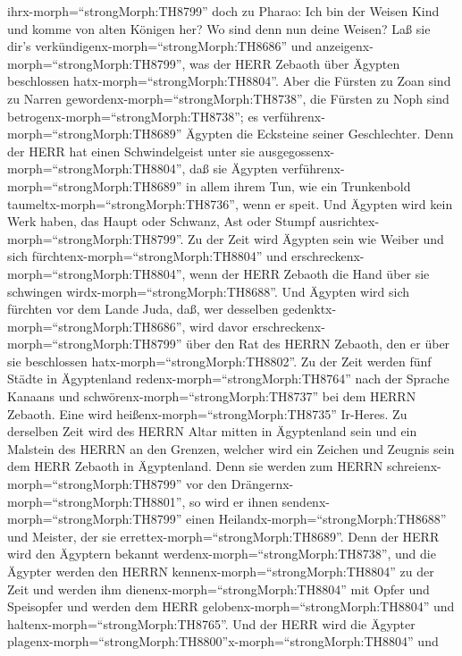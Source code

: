 ihrx-morph=``strongMorph:TH8799'' doch zu Pharao: Ich bin der Weisen
Kind und komme von alten Königen her?  Wo sind denn nun
deine Weisen? Laß sie dir's verkündigenx-morph=``strongMorph:TH8686''
und anzeigenx-morph=``strongMorph:TH8799'', was der HERR Zebaoth über
Ägypten beschlossen hatx-morph=``strongMorph:TH8804''. 
Aber die Fürsten zu Zoan sind zu Narren
gewordenx-morph=``strongMorph:TH8738'', die Fürsten zu Noph sind
betrogenx-morph=``strongMorph:TH8738''; es
verführenx-morph=``strongMorph:TH8689'' Ägypten die Ecksteine seiner
Geschlechter.  Denn der HERR hat einen Schwindelgeist unter
sie ausgegossenx-morph=``strongMorph:TH8804'', daß sie Ägypten
verführenx-morph=``strongMorph:TH8689'' in allem ihrem Tun, wie ein
Trunkenbold taumeltx-morph=``strongMorph:TH8736'', wenn er speit.
 Und Ägypten wird kein Werk haben, das Haupt oder Schwanz,
Ast oder Stumpf ausrichtex-morph=``strongMorph:TH8799''. 
Zu der Zeit wird Ägypten sein wie Weiber und sich
fürchtenx-morph=``strongMorph:TH8804'' und
erschreckenx-morph=``strongMorph:TH8804'', wenn der HERR Zebaoth die
Hand über sie schwingen wirdx-morph=``strongMorph:TH8688''.
 Und Ägypten wird sich fürchten vor dem Lande Juda, daß,
wer desselben gedenktx-morph=``strongMorph:TH8686'', wird davor
erschreckenx-morph=``strongMorph:TH8799'' über den Rat des HERRN
Zebaoth, den er über sie beschlossen hatx-morph=``strongMorph:TH8802''.
 Zu der Zeit werden fünf Städte in Ägyptenland
redenx-morph=``strongMorph:TH8764'' nach der Sprache Kanaans und
schwörenx-morph=``strongMorph:TH8737'' bei dem HERRN Zebaoth. Eine wird
heißenx-morph=``strongMorph:TH8735'' Ir-Heres.  Zu
derselben Zeit wird des HERRN Altar mitten in Ägyptenland sein und ein
Malstein des HERRN an den Grenzen,  welcher wird ein
Zeichen und Zeugnis sein dem HERR Zebaoth in Ägyptenland. Denn sie
werden zum HERRN schreienx-morph=``strongMorph:TH8799'' vor den
Drängernx-morph=``strongMorph:TH8801'', so wird er ihnen
sendenx-morph=``strongMorph:TH8799'' einen
Heilandx-morph=``strongMorph:TH8688'' und Meister, der sie
errettex-morph=``strongMorph:TH8689''.  Denn der HERR wird
den Ägyptern bekannt werdenx-morph=``strongMorph:TH8738'', und die
Ägypter werden den HERRN kennenx-morph=``strongMorph:TH8804'' zu der
Zeit und werden ihm dienenx-morph=``strongMorph:TH8804'' mit Opfer und
Speisopfer und werden dem HERR gelobenx-morph=``strongMorph:TH8804'' und
haltenx-morph=``strongMorph:TH8765''.  Und der HERR wird
die Ägypter
plagenx-morph=``strongMorph:TH8800''x-morph=``strongMorph:TH8804'' und
